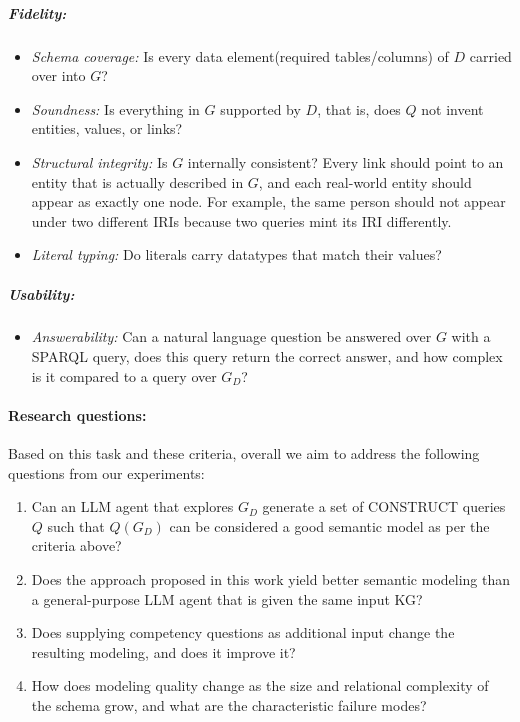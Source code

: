 \subparagraph{Fidelity:}
\begin{itemize}[leftmargin=*, itemsep=2pt]
  \item \textit{Schema coverage:} Is every data element(required tables/columns) of \(D\) carried over into \(G\)? 
  \item \textit{Soundness:} Is everything in \(G\) supported by \(D\), that is, does \(Q\) not invent entities, values, or links?
  \item \textit{Structural integrity:} Is \(G\) internally consistent? Every link should point to an entity that is actually described in \(G\), and each real-world entity should appear as exactly one node. For example, the same person should not appear under two different IRIs because two queries mint its IRI differently.
  \item \textit{Literal typing:} Do literals carry datatypes that match their values?
\end{itemize}
\clearpage
\subparagraph{Usability:}
\begin{itemize}[leftmargin=*, itemsep=2pt]
  \item \textit{Answerability:} Can a natural language question be answered over \(G\) with a SPARQL query, does this query return the correct answer, and how complex is it compared to a query over \(G_D\)?
\end{itemize}

\paragraph{Research questions:} Based on this task and these criteria, overall we aim to address the following questions from our experiments:
\begin{enumerate}[label=\textbf{RQ\arabic*.}, leftmargin=*, itemsep=2pt]
  \item Can an LLM agent that explores \(G_D\) generate a set of CONSTRUCT queries \(Q\) such that \(Q(G_D)\) can be considered a good semantic model as per the criteria above?
  \item Does the approach proposed in this work yield better semantic modeling than a general-purpose LLM agent that is given the same input KG?
  \item Does supplying competency questions as additional input change the resulting modeling, and does it improve it?
  \item How does modeling quality change as the size and relational complexity of the schema grow, and what are the characteristic failure modes?
\end{enumerate}
